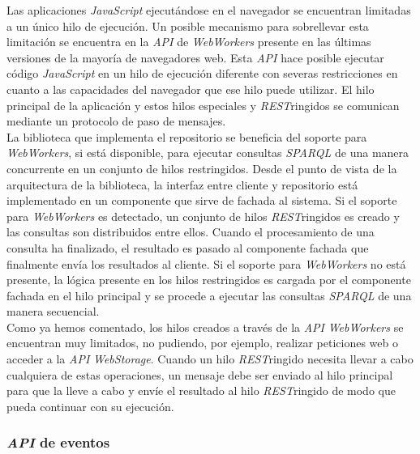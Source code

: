 Las aplicaciones \textit{JavaScript} ejecut\'andose en el navegador se encuentran limitadas a un \'unico hilo de ejecuci\'on. Un posible mecanismo para sobrellevar esta limitaci\'on se encuentra en la \textit{API} de \textit{WebWorkers} \cite{hicksonweb} presente en las \'ultimas versiones de la mayor\'ia de navegadores web. Esta \textit{API} hace posible ejecutar c\'odigo \textit{JavaScript} en un hilo de ejecuci\'on diferente con severas restricciones en cuanto a las capacidades del navegador que ese hilo puede utilizar. El hilo principal de la aplicaci\'on y estos hilos especiales y \textit{REST}ringidos se comunican mediante un protocolo de paso de mensajes.\\
La biblioteca que implementa el repositorio se beneficia del soporte para \textit{WebWorkers}, si est\'a disponible, para ejecutar consultas \textit{SPARQL} de una manera concurrente en un conjunto de hilos restringidos. Desde el punto de vista de la arquitectura de la biblioteca, la interfaz entre cliente y repositorio est\'a implementado en un componente que sirve de fachada al sistema. Si el soporte para \textit{WebWorkers} es detectado, un conjunto de hilos \textit{REST}ringidos es creado y las consultas son distribuidos entre ellos. Cuando el procesamiento de una consulta ha finalizado, el resultado es pasado al componente fachada que finalmente env\'ia los resultados al cliente. Si el soporte para \textit{WebWorkers} no est\'a presente, la l\'ogica presente en los hilos restringidos es cargada por el componente fachada en el hilo principal y se procede a ejecutar las consultas \textit{SPARQL} de una manera secuencial.\\
Como ya hemos comentado, los hilos creados a trav\'es de la \textit{API} \textit{WebWorkers} se encuentran muy limitados, no pudiendo, por ejemplo, realizar peticiones web o acceder a la \textit{API} \textit{WebStorage}. Cuando un hilo \textit{REST}ringido necesita llevar a cabo cualquiera de estas operaciones, un mensaje debe ser enviado al hilo principal para que la lleve a cabo y env\'ie el resultado al hilo \textit{REST}ringido de modo que pueda continuar con su ejecuci\'on.

\subsubsection{\textit{API} de eventos}

